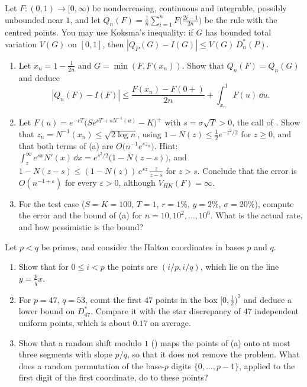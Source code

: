 \begin{exercise}\label{ex:qmc-unbounded}
\hard Let $F:(0,1)\to[0,\infty)$ be nondecreasing, continuous and integrable, possibly
unbounded near $1$, and let $Q_n(F)=\frac1n\sum_{i=1}^nF\big(\frac{2i-1}{2n}\big)$ be the rule
with the centred points. You may use Koksma's inequality: if $G$ has bounded total variation
$V(G)$ on $[0,1]$, then $|Q_P(G)-I(G)|\le V(G)\,D^*_n(P)$.
\begin{enumerate}[label=(\alph*)]
  \item Let $x_n=1-\frac1{2n}$ and $G=\min(F,F(x_n))$. Show that $Q_n(F)=Q_n(G)$ and deduce
    \[
      |Q_n(F)-I(F)|\le\frac{F(x_n)-F(0+)}{2n}+\int_{x_n}^1F(u)\,\dd u .
    \]
  \item Let $F(u)=e^{-rT}\big(Se^{\nu T+sN^{-1}(u)}-K\big)^+$ with $s=\sigma\sqrt T>0$, the
    call of . Show that $z_n=N^{-1}(x_n)\le\sqrt{2\log n}$, using
    $1-N(z)\le\frac12e^{-z^2/2}$ for $z\ge0$, and that both terms of (a) are
    $O\big(n^{-1}e^{sz_n}\big)$. Hint: $\int_z^\infty e^{sx}N'(x)\,\dd x=e^{s^2/2}\big(1-N(z-s)\big)$,
    and $1-N(z-s)\le(1-N(z))\,e^{sz}\,\frac{z}{z-s}$ for $z>s$. Conclude that the error is
    $O(n^{-1+\varepsilon})$ for every $\varepsilon>0$, although $V_{HK}(F)=\infty$.
  \item For the test case ($S=K=100$, $T=1$, $r=1\%$, $y=2\%$, $\sigma=20\%$), compute the error
    and the bound of (a) for $n=10,10^2,\dots,10^6$. What is the actual rate, and how pessimistic
    is the bound?
\end{enumerate}
\end{exercise}

\begin{exercise}\label{ex:qmc-halton-lines}
\easy Let $p<q$ be primes, and consider the Halton coordinates in bases $p$ and $q$.
\begin{enumerate}[label=(\alph*)]
  \item Show that for $0\le i<p$ the points are $(i/p,i/q)$, which lie on the line $y=\frac pqx$.
  \item For $p=47$, $q=53$, count the first $47$ points in the box $[0,\frac12)^2$ and deduce
    a lower bound on $D^*_{47}$. Compare it with the star discrepancy of $47$ independent
    uniform points, which is about $0.17$ on average.
  \item Show that a random shift modulo $1$ () maps the points of (a)
    onto at most three segments with slope $p/q$, so that it does not remove the problem. What
    does a random permutation of the base-$p$ digits $\{0,\dots,p-1\}$, applied to the first
    digit of the first coordinate, do to these points?
\end{enumerate}
\end{exercise}

